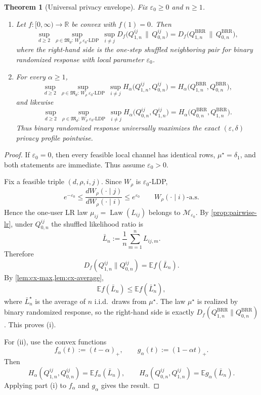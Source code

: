 \documentclass[11pt]{amsart}
\newtheorem{theorem}{Theorem}[section]
\theoremstyle{definition}
\DeclareMathOperator{\Law}{Law}
\newcommand{\R}{\mathbb R}
\newcommand{\E}{\mathbb E}
\newcommand{\cM}{\mathcal M}
\newcommand{\fM}{\mathfrak M}
\begin{document}
\begin{theorem}[Universal privacy envelope]\label{thm:privacy-envelope}
Fix $\varepsilon_0\ge 0$ and $n\ge 1$.

\begin{enumerate}[label=\textup{(\roman*)}]
\item Let $f:[0,\infty)\to\R$ be convex with $f(1)=0$. Then
\[
\sup_{d\ge 2}\ \sup_{\rho\in\fM_d:\,W_\rho\ \varepsilon_0\text{-LDP}}\ \sup_{i\neq j}
D_f\bigl(Q_{1,n}^{ij}\,\|\,Q_{0,n}^{ij}\bigr)
=
D_f\bigl(Q_{1,n}^{\mathrm{BRR}}\,\|\,Q_{0,n}^{\mathrm{BRR}}\bigr),
\]
where the right-hand side is the one-step shuffled neighboring pair for binary randomized response with local parameter $\varepsilon_0$.

\item For every $\alpha\ge 1$,
\[
\sup_{d\ge 2}\ \sup_{\rho\in\fM_d:\,W_\rho\ \varepsilon_0\text{-LDP}}\ \sup_{i\neq j} H_\alpha\bigl(Q_{1,n}^{ij},Q_{0,n}^{ij}\bigr)
=
H_\alpha\bigl(Q_{1,n}^{\mathrm{BRR}},Q_{0,n}^{\mathrm{BRR}}\bigr),
\]
and likewise
\[
\sup_{d\ge 2}\ \sup_{\rho\in\fM_d:\,W_\rho\ \varepsilon_0\text{-LDP}}\ \sup_{i\neq j} H_\alpha\bigl(Q_{0,n}^{ij},Q_{1,n}^{ij}\bigr)
=
H_\alpha\bigl(Q_{0,n}^{\mathrm{BRR}},Q_{1,n}^{\mathrm{BRR}}\bigr).
\]
Thus binary randomized response universally maximizes the exact $(\varepsilon,\delta)$ privacy profile pointwise.
\end{enumerate}
\end{theorem}

\begin{proof}
If $\varepsilon_0=0$, then every feasible local channel has identical rows, $\mu^\star=\delta_1$, and both statements are immediate. Thus assume $\varepsilon_0>0$.

Fix a feasible triple $(d,\rho,i,j)$. Since $W_\rho$ is $\varepsilon_0$-LDP,
\[
e^{-\varepsilon_0}\le \frac{dW_\rho(\cdot\mid j)}{dW_\rho(\cdot\mid i)}\le e^{\varepsilon_0}
\qquad W_\rho(\cdot\mid i)\text{-a.s.}
\]
Hence the one-user LR law $\mu_{ij}=\Law(L_{ij})$ belongs to $\cM_{\varepsilon_0}$.
By \cref{prop:pairwise-lr}, under $Q_{0,n}^{ij}$ the shuffled likelihood ratio is
\[
\bar L_n:=\frac1n\sum_{m=1}^n L_{ij,m}.
\]
Therefore
\[
D_f(Q_{1,n}^{ij}\|Q_{0,n}^{ij})=\E f(\bar L_n).
\]
By \cref{lem:cx-max,lem:cx-average},
\[
\E f(\bar L_n)\le \E f(\bar L_n^\star),
\]
where $\bar L_n^\star$ is the average of $n$ i.i.d.\ draws from $\mu^\star$. The law $\mu^\star$ is realized by binary randomized response, so the right-hand side is exactly $D_f(Q_{1,n}^{\mathrm{BRR}}\|Q_{0,n}^{\mathrm{BRR}})$. This proves (i).

For (ii), use the convex functions
\[
f_\alpha(t):=(t-\alpha)_+,
\qquad
 g_\alpha(t):=(1-\alpha t)_+.
\]
Then
\[
H_\alpha(Q_{1,n}^{ij},Q_{0,n}^{ij})=\E f_\alpha(\bar L_n),
\qquad
H_\alpha(Q_{0,n}^{ij},Q_{1,n}^{ij})=\E g_\alpha(\bar L_n).
\]
Applying part (i) to $f_\alpha$ and $g_\alpha$ gives the result.
\end{proof}
\end{document}
